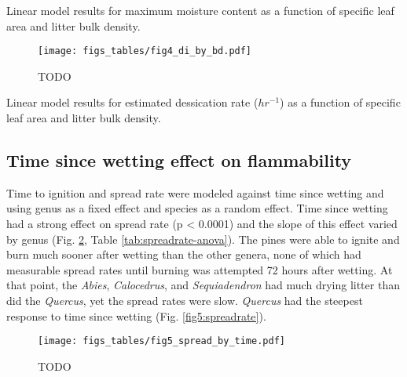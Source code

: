 \documentclass[fire,article,submit,moreauthors,pdftex]{Definitions/mdpi}
\begin{document}
\begin{table}[H]
  \caption{Linear model results for maximum moisture content as a function of specific leaf area and litter bulk density.}
  \label{tab2:mc-anova}
\centering

\end{table}


\begin{figure}[H]
  \centering
\texttt{[image: figs\_tables/fig4\_di\_by\_bd.pdf]}
\caption[Litter density effect on dessication rate.]{  TODO }
  \label{fig:bd-di}
\end{figure}

\begin{table}[H]
  \caption{Linear model results for estimated dessication rate ($hr^{-1}$) as a function of specific leaf area and litter bulk density.}
  \label{tab2:di-anova}
\centering

\end{table}


\subsection{Time since wetting effect on flammability}

Time to ignition and spread rate were modeled against time since wetting and using genus as a fixed effect and species as a random effect.  Time since wetting had a strong effect on spread rate (p < 0.0001) and the slope of this effect varied by genus (Fig. \ref{fig:spreadrate}, Table \ref{tab:spreadrate-anova}). The pines were able to ignite and burn much sooner after wetting than the other genera, none of which had measurable spread rates until burning was attempted 72 hours after wetting. At that point, the \emph{Abies}, \emph{Calocedrus}, and \emph{Sequiadendron} had much drying litter than did the \emph{Quercus}, yet the spread rates were slow.  \emph{Quercus} had the steepest response to time since wetting (Fig. \ref{fig5:spreadrate}).


\begin{figure}[H]
  \centering
\texttt{[image: figs\_tables/fig5\_spread\_by\_time.pdf]}
\caption[Flame spread rate by time since wetting]{TODO }
  \label{fig:spreadrate}
\end{figure}
\end{document}
